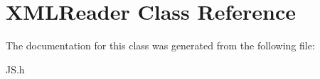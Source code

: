 \hypertarget{class_x_m_l_reader}{\section{\-X\-M\-L\-Reader \-Class \-Reference}
\label{class_x_m_l_reader}
}


\-The documentation for this class was generated from the following file\-:\begin{DoxyCompactItemize}
\item 
\-J\-S.\-h\end{DoxyCompactItemize}
